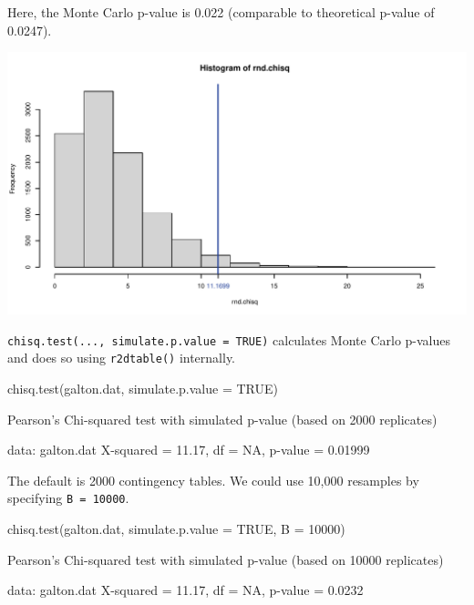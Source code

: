 \documentclass[a4paper]{article}
\begin{document}
Here, the Monte Carlo p-value is 0.022 (comparable to theoretical p-value of 0.0247).
\begin{Schunk}


{\centering \includegraphics[width=\maxwidth]{figure/listings-unnamed-chunk-54-1} 

}

\end{Schunk}
\lstinline|chisq.test(..., simulate.p.value = TRUE)| calculates Monte Carlo p-values and does so using \lstinline|r2dtable()| internally.
\begin{Schunk}
\begin{Sinput}
chisq.test(galton.dat, simulate.p.value = TRUE)
\end{Sinput}
\begin{Soutput}

	Pearson's Chi-squared test with simulated p-value (based on 2000
	replicates)

data:  galton.dat
X-squared = 11.17, df = NA, p-value = 0.01999
\end{Soutput}
\end{Schunk}
The default is 2000 contingency tables. We could use 10,000 resamples by specifying \lstinline|B = 10000|.
\begin{Schunk}
\begin{Sinput}
chisq.test(galton.dat, simulate.p.value = TRUE, B = 10000)
\end{Sinput}
\begin{Soutput}

	Pearson's Chi-squared test with simulated p-value (based on 10000
	replicates)

data:  galton.dat
X-squared = 11.17, df = NA, p-value = 0.0232
\end{Soutput}
\end{Schunk}
\end{document}
